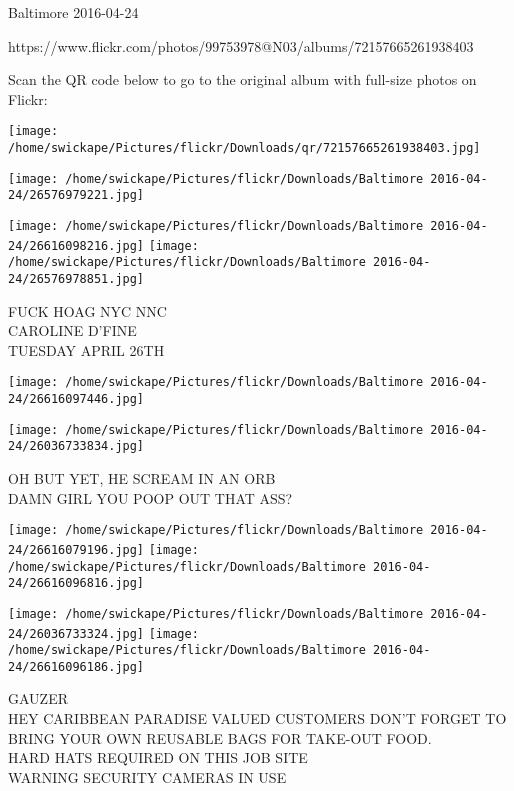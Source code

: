 \documentclass[10pt,letterpaper]{article}
\begin{document}
Baltimore 2016-04-24

https://www.flickr.com/photos/99753978@N03/albums/72157665261938403

Scan the QR code below to go to the original album with full-size photos on Flickr:

\texttt{[image: /home/swickape/Pictures/flickr/Downloads/qr/72157665261938403.jpg]}
\pagebreak

\texttt{[image: /home/swickape/Pictures/flickr/Downloads/Baltimore 2016-04-24/26576979221.jpg]}

\vspace{0.25in}
\texttt{[image: /home/swickape/Pictures/flickr/Downloads/Baltimore 2016-04-24/26616098216.jpg]}
\texttt{[image: /home/swickape/Pictures/flickr/Downloads/Baltimore 2016-04-24/26576978851.jpg]}

FUCK HOAG NYC NNC\\
CAROLINE D'FINE\\
TUESDAY APRIL 26TH\\
\pagebreak

\texttt{[image: /home/swickape/Pictures/flickr/Downloads/Baltimore 2016-04-24/26616097446.jpg]}

\vspace{0.25in}
\texttt{[image: /home/swickape/Pictures/flickr/Downloads/Baltimore 2016-04-24/26036733834.jpg]}

OH BUT YET, HE SCREAM IN AN ORB\\
DAMN GIRL YOU POOP OUT THAT ASS?\\
\pagebreak

\texttt{[image: /home/swickape/Pictures/flickr/Downloads/Baltimore 2016-04-24/26616079196.jpg]}
\texttt{[image: /home/swickape/Pictures/flickr/Downloads/Baltimore 2016-04-24/26616096816.jpg]}

\texttt{[image: /home/swickape/Pictures/flickr/Downloads/Baltimore 2016-04-24/26036733324.jpg]}
\texttt{[image: /home/swickape/Pictures/flickr/Downloads/Baltimore 2016-04-24/26616096186.jpg]}

GAUZER\\
HEY CARIBBEAN PARADISE VALUED CUSTOMERS DON'T FORGET TO BRING YOUR OWN REUSABLE BAGS FOR TAKE{-}OUT FOOD.\\
HARD HATS REQUIRED ON THIS JOB SITE\\
WARNING SECURITY CAMERAS IN USE\\
\pagebreak
\end{document}
